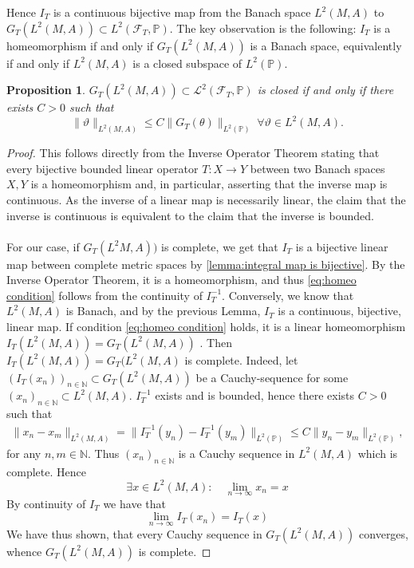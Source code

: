\documentclass[11pt,a4paper,twoside,openany]{report}
\theoremstyle{plain} %
\newtheorem{proposition}[proposition]{Proposition}
\theoremstyle{definition} %
\theoremstyle{remark} %
\let\parencite\authnumparencite
\begin{document}
Hence \(I_{T}\) is a continuous bijective map from the Banach space \(L^2(M,A)\) to \(G_T(L^2(M,A))\subset L^2(\mathcal{F}_{T},\mathbb{P})\). The key observation is the following:
\bigbreak
\(I_{T}\) is a homeomorphism if and only if \(G_T(L^2(M,A))\) is a Banach space, equivalently if and only if \(L^2(M,A)\) is a closed subspace of \(L^2(\mathbb{P})\).
\begin{proposition}\label{prop:closedness of G_T in L^2 functional analytic iff condition}
 \(G_T(L^2(M,A))\subset 
\mathcal{L}^2(\mathcal{F}_{T},\mathbb{P})\) is closed if and only if there exists \(C>0\) such that 
\begin{equation}\label{eq:homeo condition}
    \lVert \vartheta\rVert_{L^2(M,A)}\leq C\lVert G_T(\theta)\rVert_{L^2(\mathbb{P})}\;\forall\vartheta\in L^2(M,A).
\end{equation}
\end{proposition}
\begin{proof}
    This follows directly from the Inverse Operator Theorem \parencite[Cor.3.2,Ch.4]{SteinShakarchi2005RealAnalysis} stating that every bijective bounded linear operator \(T:X\to Y\) between two Banach spaces \(X,Y\) is a homeomorphism and, in particular, asserting that the inverse map is continuous. As the inverse of a linear map is necessarily linear, the claim that the inverse is continuous is equivalent to the claim that the inverse is bounded. 
    \\\\
   For our case, if \(G_T(L^2M,A))\) is complete,  we get that \(I_{T}\) is a bijective linear map between complete metric spaces by \cref{lemma:integral map is bijective}. By the Inverse Operator Theorem, it is a homeomorphism, and thus \cref{eq:homeo condition} follows from the continuity of \(I_{T}^{-1}\). Conversely, we know that \(L^2(M,A)\) is Banach, and by the previous Lemma, \(I_{T}\) is a continuous, bijective, linear map. If condition \cref{eq:homeo condition} holds, it is a linear homeomorphism \(I_{T}(L^2(M,A))=G_T(L^2(M,A))\) . Then \(I_{T}(L^2(M,A))=G_T(L^2(M,A)\) is complete. Indeed, let \((I_{T}(x_n))_{n\in\mathbb{N}}\subset G_T(L^2(M,A))\) be a Cauchy-sequence for some \((x_n)_{n\in\mathbb{N}}\subset L^2(M,A)\). \(I_{T}^{-1}\) exists and is bounded, hence there exists \(C>0\) such that
   \begin{align*}
       \lVert x_n-x_m\rVert_{L^2(M,A)}=\lVert I_{T}^{-1}(y_n)-I_{T}^{-1}(y_m)\rVert_{L^2(\mathbb{P})}\leq C\lVert y_n-y_m\rVert_{L^2(\mathbb{P})},
   \end{align*}
   for any \(n,m\in\mathbb{N}\).
   Thus \((x_n)_{n\in\mathbb{N}}\) is a Cauchy sequence in \(L^2(M,A)\) which is complete. Hence 
   \begin{equation}
       \exists x\in L^2(M,A):\quad\lim_{n\to\infty}x_n=x
   \end{equation}
   By continuity of \(I_T\) we have that 
   \begin{equation}
       \lim_{n\to\infty}I_{T}(x_n)=I_{T}(x)
   \end{equation}
   We have thus shown, that every Cauchy sequence in \(G_T(L^2(M,A))\) converges, whence \(G_T(L^2(M,A))\) is complete.
\end{proof}
\end{document}
